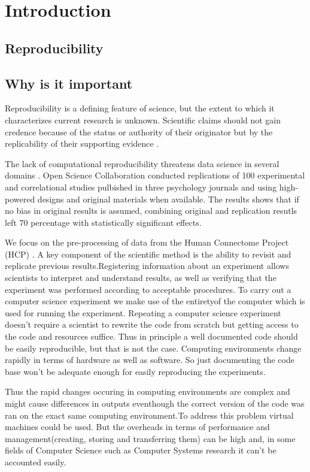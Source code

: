 \chapter{Introduction}
\section{Reproducibility}
\section{Why is it important}

Reproducibility is a defining feature of science, but the extent to which it characterizes current research is unknown. Scientific claims should not gain credence because of the status or authority of their originator but by the replicability of their supporting evidence \cite{aac4716}.  

The lack of computational reproducibility threatens data science in several domains \cite{Gla15}. Open Science Collaboration \cite{aac4716} conducted replications of 100 experimental and correlational studies pulbished in three psychology journals and using high-powered designs and original materials when available. The results shows that if no bias in original results is assumed, combining original and replication resutls left 70 percentage with statistically significant effects.
 
We focus on the pre-processing of data from the Human Connectome Project (HCP) \cite{Gla13}.
A key component of the scientific method is the ability to revisit and replicate previous results.Registering information about an experiment allows scientists to interpret and
understand results, as well as verifying that the experiment was performed according to acceptable procedures. To carry out a computer science experiment we make use of the entiretyof the computer which is used for running the experiment. Repeating a computer science experiment doesn't require a scientist to rewrite the code from scratch but getting access to the code and resources suffice. Thus in principle a well documented code should be easily reproducible, but that is not the case. Computing environments change rapidly in terms of hardware as well as software. So just documenting the code base won't be adequate enough for easily reproducing the experiments.

Thus the rapid changes occuring in computing environments are complex and might cause differences in outputs eventhough the correct version of the code was ran on the exact same computing environment.To address this problem virtual machines could be used. But the overheads in terms of performance and management(creating, storing and transferring them) can be high and, in some fields of Computer Science such as Computer Systems research it can't be accounted easily. \cite{7092948}

